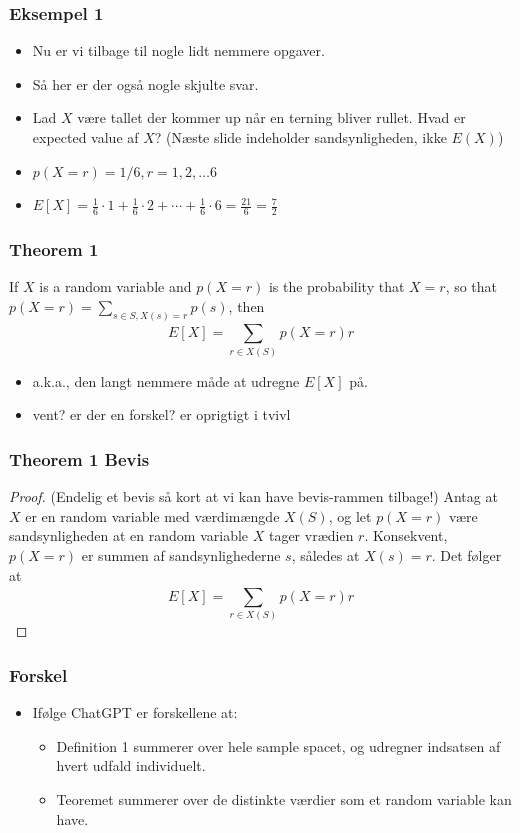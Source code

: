 \documentclass{beamer}
\begin{document}
\begin{frame}
  \frametitle{Eksempel 1}
  \begin{itemize}
  \item<1-> Nu er vi tilbage til nogle lidt nemmere opgaver. 
  \item<1-> Så her er der også nogle skjulte svar.
  \item<1-> Lad $X$ være tallet der kommer up når en terning bliver rullet. Hvad er expected value af $X$? (Næste slide indeholder sandsynligheden, ikke $E(X)$)
  \item<2-> $p(X = r) = 1/6, r = 1,2,\ldots 6$
  \item<3-> $E[X] = \frac{1}{6} \cdot 1 + \frac{1}{6} \cdot 2 + \cdots + \frac{1}{6} \cdot 6 = \frac{21}{6} = \frac{7}{2}$
  \end{itemize} 
\end{frame}


\begin{frame}
  \frametitle{Theorem 1}
  \begin{theorem}
    If $X$ is a random variable and $p(X = r)$ is the probability that $X = r$, so that $p(X=r) = \sum_{s \in S, X(s)=r} p(s)$, then
    \[ E[X] = \sum_{r \in X(S)}^{} p(X=r)r  \]
  \end{theorem} 
  \begin{itemize}
  \item a.k.a., den langt nemmere måde at udregne $E[X]$ på.
  \item vent? er der en forskel? er oprigtigt i tvivl
  \end{itemize}
\end{frame}

\begin{frame}
  \frametitle{Theorem 1 Bevis}
  \begin{proof}
    (Endelig et bevis så kort at vi kan have bevis-rammen tilbage!)
    Antag at $X$ er en random variable med værdimængde $X(S)$, og let $p(X=r)$ være sandsynligheden at en random variable $X$ tager vrædien $r$. Konsekvent, $p(X=r)$ er summen af sandsynlighederne $s$, således at $X(s) = r$. Det følger at
    \[E[X] = \sum_{r \in X(S)}^{} p(X = r)r  \]
  \end{proof}
\end{frame}

\begin{frame}
  \frametitle{Forskel}
  \begin{itemize}
  \item Ifølge ChatGPT er forskellene at:
    \begin{itemize}
    \item Definition 1 summerer over hele sample spacet, og udregner indsatsen af hvert udfald individuelt.
    \item Teoremet summerer over de distinkte værdier som et random variable kan have. 
    \end{itemize}
  \end{itemize}
\end{frame}
\end{document}
